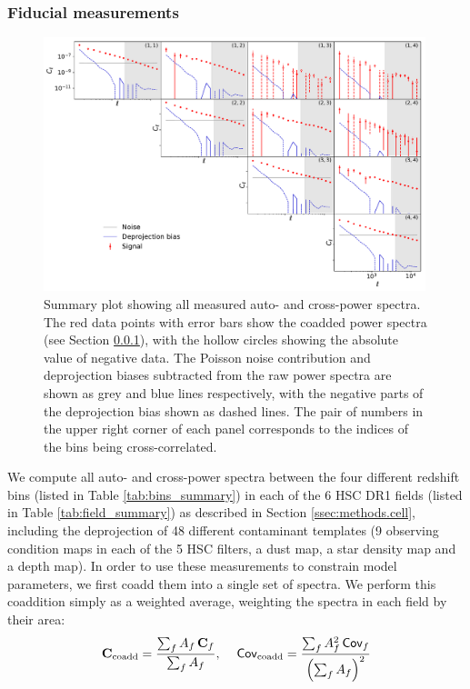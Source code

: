 \documentclass[a4paper,11pt]{article}
\begin{document}
    \subsubsection{Fiducial measurements}\label{sssec:results.spectra.fid}
      \begin{figure}
        \centering
        \includegraphics[width=0.99\textwidth]{figures/cls_summary.pdf}
        \caption{Summary plot showing all measured auto- and cross-power spectra. The red data points with error bars show the coadded power spectra (see Section \ref{sssec:results.spectra.fid}), with the hollow circles showing the absolute value of negative data. The Poisson noise contribution and deprojection biases subtracted from the raw power spectra are shown as grey and blue lines respectively, with the negative parts of the deprojection bias shown as dashed lines. The pair of numbers in the upper right corner of each panel corresponds to the indices of the bins being cross-correlated.}
        \label{fig:cls_summary}
      \end{figure}
      We compute all auto- and cross-power spectra between the four different redshift bins (listed in Table \ref{tab:bins_summary}) in each of the 6 HSC DR1 fields (listed in Table \ref{tab:field_summary}) as described in Section \ref{ssec:methods.cell}, including the deprojection of 48 different contaminant templates (9 observing condition maps in each of the 5 HSC filters, a dust map, a star density map and a depth map). In order to use these measurements to constrain model parameters, we first coadd them into a single set of spectra. We perform this coaddition simply as a weighted average, weighting the spectra in each field by their area:
      \begin{equation}
        {\bf C}_{\rm coadd}=\frac{\sum_f A_f\,{\bf C}_f}{\sum_f A_f}, \hspace{12pt}{\sf Cov}_{\rm coadd}=\frac{\sum_f A_f^2\,{\sf Cov}_f}{\left(\sum_f A_f\right)^2}
      \end{equation}
\end{document}
